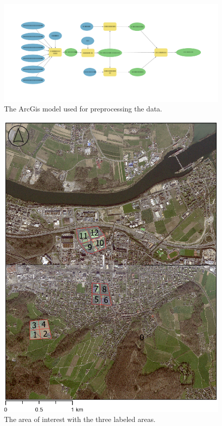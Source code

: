 \begin{figure}[H]
    \centering
    \captionsetup{width=0.8\linewidth}
    \includegraphics[width=\linewidth]{figures/Model.pdf}
    \caption{The ArcGis model used for preprocessing the data.}
    \label{fig:processing_model}
\end{figure}

\begin{figure}[H]
    \centering
    \captionsetup{width=0.8\linewidth}
    \includegraphics[scale=0.6]{figures/AOI_Labeled.png}
    \caption{The area of interest with the three labeled areas.}
    \label{fig:aoi_labeled}
\end{figure}



